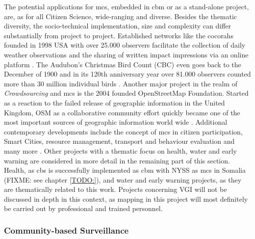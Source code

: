 {The potential applications for \acrshort*{mcs}, embedded in \acrshort*{cbm} or as a stand-alone project, are, as for all Citizen Science, wide-ranging and diverse. Besides the thematic diversity, the socio-technical implementation, size and complexity can differ substantially from project to project. Established networks like the \acrfull*{cocorahs} founded in 1998 USA with over 25.000 observers facilitate the collection of daily weather observations and the sharing of written impact impressions via an online platform \autocite{cocorahsCoCoRaHSCommunityCollaborative2023,lackstromBackyardHydroclimatologyCitizen2022}. The Audubon's Christmas Bird Count (CBC) even goes back to the December of 1900 and in its 120th anniversary year over 81.000 observers counted more than 30 million individual birds \autocite{lebaron122ndChristmasBird2022}. Another major project in the realm of \textit{Crowdsourcing} and \acrshort*{mcs} is the 2004 founded OpenStreetMap Foundation. Started as a reaction to the failed release of geographic information in the United Kingdom, OSM as a collaborative community effort quickly became one of the most important sources of geographic information world wide \autocite{bennettOpenStreetMap2010, openstreetmapcontributorsOpenStreetMapBasemap2020}. Additional contemporary developments include the concept of \acrshort*{mcs} in citizen participation, Smart Cities, resource management, transport and behaviour evaluation and many more \autocite{dipasDIPASOrgDIPAS2023,europeancommissionCitizencentredApproachSmart2021, wangSurveyApplicationKey2022}. 
Other projects with a thematic focus on health, water and early warning are considered in more detail in the remaining part of this section. Health, as \acrfull*{cbs} is successfully implemented as \acrshort*{cbm} with NYSS as \acrshort*{mcs} in Somalia (FIXME: see chapter \ref*{TODO:}), and water and early warning projects, as they are thematically related to this work. Projects concerning VGI will not be discussed in depth in this context, as mapping in this project will most definitely be carried out by professional and trained personnel. 

\subsubsection*{Community-based Surveillance}

}
